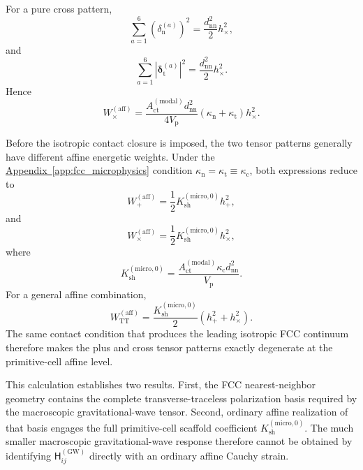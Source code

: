 For a pure cross pattern,
\begin{equation}
    \sum_{a=1}^{6} \left( \delta_{\mathrm{n}}^{(a)} \right)^{2} = \frac{d_{\mathrm{nn}}^{2}}{2} h_{\times}^{2},
\end{equation}
and
\begin{equation}
    \sum_{a=1}^{6} \left| \boldsymbol{\delta}_{\mathrm{t}}^{(a)} \right|^{2} = \frac{d_{\mathrm{nn}}^{2}}{2} h_{\times}^{2}.
\end{equation}
Hence
\begin{equation}
    W_{\times}^{(\mathrm{aff})} = \frac{A_{\mathrm{ct}}^{(\mathrm{modal})} d_{\mathrm{nn}}^{2}}{4V_{\mathrm{p}}} \left( \kappa_{\mathrm{n}} + \kappa_{\mathrm{t}} \right) h_{\times}^{2}.
\end{equation}

Before the isotropic contact closure is imposed, the two tensor patterns generally have different affine energetic weights. Under the \hyperref[app:fcc_microphysics]{Appendix~\ref*{app:fcc_microphysics}} condition $\kappa_{\mathrm{n}} = \kappa_{\mathrm{t}} \equiv \kappa_{\mathrm{c}}$, both expressions reduce to
\begin{equation}
    W_{+}^{(\mathrm{aff})} = \frac{1}{2} K_{\mathrm{sh}}^{(\mathrm{micro},0)} h_{+}^{2},
\end{equation}
and
\begin{equation}
    W_{\times}^{(\mathrm{aff})} = \frac{1}{2} K_{\mathrm{sh}}^{(\mathrm{micro},0)} h_{\times}^{2},
\end{equation}
where
\begin{equation}
    K_{\mathrm{sh}}^{(\mathrm{micro},0)} = \frac{A_{\mathrm{ct}}^{(\mathrm{modal})} \kappa_{\mathrm{c}} d_{\mathrm{nn}}^{2}}{V_{\mathrm{p}}}.
\end{equation}
For a general affine combination,
\begin{equation}
    W_{\mathrm{TT}}^{(\mathrm{aff})} = \frac{K_{\mathrm{sh}}^{(\mathrm{micro},0)}}{2} \left( h_{+}^{2} + h_{\times}^{2} \right).
\end{equation}
The same contact condition that produces the leading isotropic FCC continuum therefore makes the plus and cross tensor patterns exactly degenerate at the primitive-cell affine level.

This calculation establishes two results. First, the FCC nearest-neighbor geometry contains the complete transverse-traceless polarization basis required by the macroscopic gravitational-wave tensor. Second, ordinary affine realization of that basis engages the full primitive-cell scaffold coefficient $K_{\mathrm{sh}}^{(\mathrm{micro},0)}$. The much smaller macroscopic gravitational-wave response therefore cannot be obtained by identifying $\mathsf{H}_{ij}^{(\mathrm{GW})}$ directly with an ordinary affine Cauchy strain.

